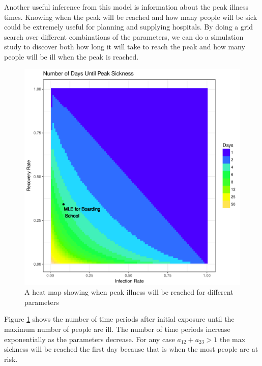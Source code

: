 \documentclass{svproc}
\begin{document}
Another useful inference from this model is information about the peak illness times. Knowing when the peak will be reached and how many people will be sick could be extremely useful for planning and supplying hospitals. By doing a grid search over different combinations of the parameters, we can do a simulation study to discover both how long it will take to reach the peak and how many people will be ill when the peak is reached. 
\begin{figure}
\centering
\includegraphics[scale=.7]{DayGrid.pdf}
\caption{A heat map showing when peak illness will be reached for different parameters}
\label{plot2}
\end{figure}

Figure \ref{plot2} shows the number of time periods after initial exposure until the maximum number of people are ill. The number of time periods increase exponentially as the parameters decrease. For any case $a_{12}+a_{23}>1$ the max sickness will be reached the first day because that is when the most people are at risk. 
\end{document}
